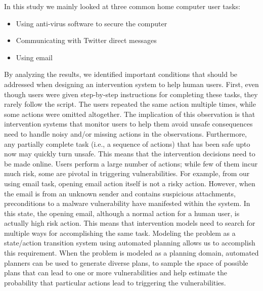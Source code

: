 In this study we mainly looked at three common home computer user tasks:
\begin{itemize}
\item Using anti-virus software to secure the computer
\item Communicating with Twitter direct messages
\item Using email
\end{itemize}

By analyzing the results, we identified important conditions that should be addressed when designing an intervention system to help human users. First, even though users were given step-by-step instructions for completing these tasks, they rarely follow the script. 
The users repeated the same action multiple times, while some actions were omitted altogether. 
The implication of this observation is that intervention systems that monitor users to help them avoid unsafe consequences need to handle noisy and/or missing actions in the observations.
Furthermore, any partially complete task (i.e., a sequence of actions) that has been safe upto now may quickly turn unsafe. 
This means that the intervention decisions need to be made online. 
Users perform a large number of actions; while few of them incur much risk, some are pivotal in triggering vulnerabilities. For example, from our using email task, opening email action itself is not a risky action. 
However, when the email is from an unknown sender and contains suspicious attachments, preconditions to a malware vulnerability have manifested within the system. In this state, the opening email, although a normal action for a human user, is actually high risk action.
This means that intervention models need to search for multiple ways for accomplishing the same task. Modeling the problem as a state/action transition system using automated planning allows us to accomplish this requirement. When the problem is modeled as a planning domain, automated planners can be used to generate diverse plans, to sample the space of possible plans that can lead to one or more vulnerabilities and help
estimate the probability that particular actions lead to triggering the vulnerabilities.


